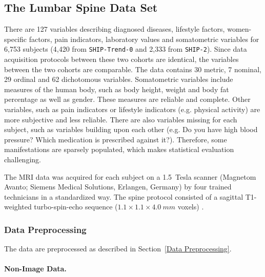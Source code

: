 \documentclass[journal]{style/vgtc} 			          %
\begin{document}
\subsection{The Lumbar Spine Data Set}
%
There are 127 variables describing diagnosed diseases, lifestyle factors, women-specific factors, pain indicators, laboratory values and somatometric variables for 6,753 subjects (4,420 from \texttt{SHIP-Trend-0} and 2,333 from \texttt{SHIP-2}).
%
Since data acquisition protocols between these two cohorts are identical, the variables between the two cohorts are comparable.
%
The data contains 30 metric, 7 nominal, 29 ordinal and 62 dichotomous variables.
%
Somatometric variables include measures of the human body, such as body height, weight and body fat percentage as well as gender.
%
These measures are reliable and complete.
%
Other variables, such as pain indicators or lifestyle indicators (e.g. physical activity) are more subjective and less reliable.
%
There are also variables missing for each subject, such as variables building upon each other (e.g. Do you have high blood pressure? Which medication is prescribed against it?).
%
Therefore, some manifestations are sparsely populated, which makes statistical evaluation challenging.
%
%

The MRI data was acquired for each subject on a 1.5~Tesla scanner (Magnetom Avanto; Siemens Medical Solutions, Erlangen, Germany) by four trained technicians in a standardized way.
%
The spine protocol consisted of a sagittal T1-weighted turbo-spin-echo sequence ($1.1\times1.1\times4.0~mm$ voxels) \cite{Hegenscheid2013}. %

\subsubsection{Data Preprocessing} \label{application:Data Preprocessing}
The data are preprocessed as described in Section~\ref{Data Preprocessing}.
%
\paragraph{Non-Image Data.} 
\end{document}
